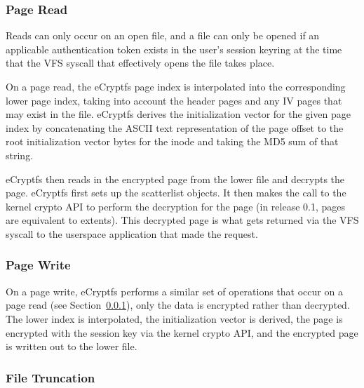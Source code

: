 \documentclass{article}
\begin{document}
\subsubsection{Page Read}

\label{page_read}

Reads can only occur on an open file, and a file can only be opened if
an applicable authentication token exists in the user's session
keyring at the time that the VFS syscall that effectively opens the
file takes place.

On a page read, 
the eCryptfs page index is interpolated into the corresponding lower
page index, taking into account the header pages and any IV pages that
may exist in the file.
eCryptfs derives the initialization vector for the given page index
by concatenating the ASCII text representation of the page offset to
the root initialization vector bytes for the inode and taking the MD5
sum of that string.

eCryptfs then reads in the encrypted page from the lower file and
decrypts the page. 
eCryptfs first sets up the scatterlist objects.
It then makes the call to the kernel crypto API to perform the
decryption for the page
(in release 0.1, pages are equivalent to extents). This decrypted page
is what gets returned via the VFS syscall to the userspace application
that made the request.

\subsubsection{Page Write}

On a page write, 
eCryptfs performs a similar set of operations that occur on a page
read (see Section~\ref{page_read}), only the data is encrypted rather
than decrypted. The lower index is interpolated, the initialization
vector is derived, the page is encrypted with the session key via the
kernel crypto API, and the encrypted page is written out to the lower
file.

\subsubsection{File Truncation}
\end{document}
